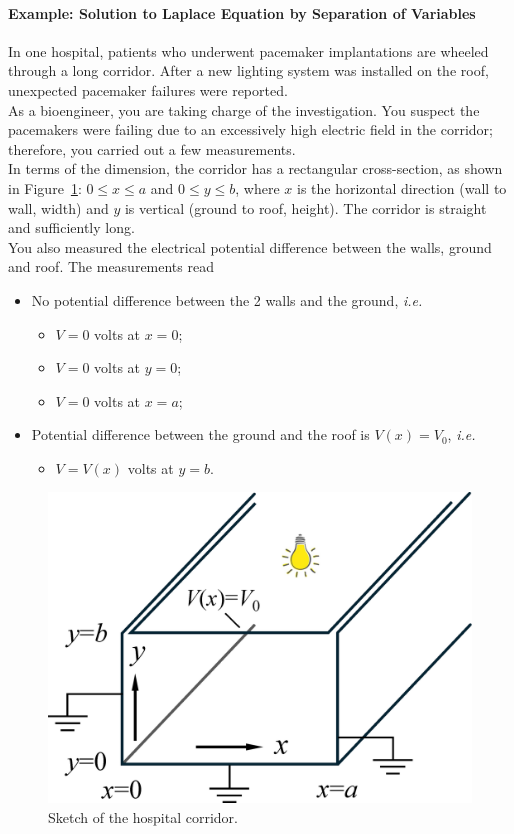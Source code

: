 \documentclass[a4paper, 12pt]{article}
\begin{document}
\paragraph{Example: Solution to Laplace Equation by Separation of Variables}
\begin{mdframed}

In one hospital, patients who underwent pacemaker implantations are wheeled through a long corridor. After a new lighting system was installed on the roof, unexpected pacemaker failures were reported.\\

As a bioengineer, you are taking charge of the investigation. You suspect the pacemakers were failing due to an excessively high electric field in the corridor; therefore, you carried out a few measurements. \\

In terms of the dimension, the corridor has a rectangular cross-section, as shown in Figure~\ref{fig:corridor}: $0 \leq x \leq a$ and $0 \leq y \leq b$, where $x$ is the horizontal direction (wall to wall, width) and $y$ is vertical (ground to roof, height). The corridor is straight and sufficiently long. \\

You also measured the electrical potential difference between the walls, ground and roof. The measurements read

\begin{itemize}
    \item No potential difference between the 2 walls and the ground, \textit{i.e.}
    \begin{itemize}
    \item $V = 0$ volts at $x = 0$;
    \item $V = 0$ volts at $y = 0$;
    \item $V = 0$ volts at $x = a$;
    \end{itemize}
    
    \item Potential difference between the ground and the roof is $V(x)=V_{0}$, \textit{i.e.}
    \begin{itemize}
    \item $V = V(x)$ volts at $y = b$.
    \end{itemize}
\end{itemize} 

\begin{figure}[H]
    \centering
    \includegraphics[width=0.5\linewidth]{./images/bulb_on_roof.eps}
    \caption{Sketch of the hospital corridor.}
    \label{fig:corridor}
\end{figure}


\end{mdframed}
\end{document}
